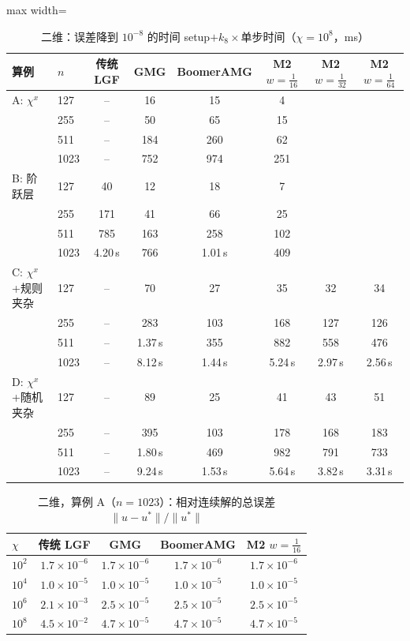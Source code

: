 \begin{table}[H]\centering\small
\caption{二维：误差降到 $10^{-8}$ 的时间 setup$+k_8\times$单步时间（$\chi=10^8$，ms）}\label{tab:t82d}
\begin{adjustbox}{max width=\textwidth}
\begin{tabular}{llcccccc}
\toprule
算例 & $n$ & 传统 LGF & GMG & BoomerAMG & M2 $w{=}\frac1{16}$ & M2 $w{=}\frac1{32}$ & M2 $w{=}\frac1{64}$ \\
\midrule
A: $\chi^x$ & 127 & -- & 16 & 15 & 4 &  &  \\
 & 255 & -- & 50 & 65 & 15 &  &  \\
 & 511 & -- & 184 & 260 & 62 &  &  \\
 & 1023 & -- & 752 & 974 & 251 &  &  \\
\midrule
B: 阶跃层 & 127 & 40 & 12 & 18 & 7 &  &  \\
 & 255 & 171 & 41 & 66 & 25 &  &  \\
 & 511 & 785 & 163 & 258 & 102 &  &  \\
 & 1023 & 4.20\,s & 766 & 1.01\,s & 409 &  &  \\
\midrule
C: $\chi^x$+规则夹杂 & 127 & -- & 70 & 27 & 35 & 32 & 34 \\
 & 255 & -- & 283 & 103 & 168 & 127 & 126 \\
 & 511 & -- & 1.37\,s & 355 & 882 & 558 & 476 \\
 & 1023 & -- & 8.12\,s & 1.44\,s & 5.24\,s & 2.97\,s & 2.56\,s \\
\midrule
D: $\chi^x$+随机夹杂 & 127 & -- & 89 & 25 & 41 & 43 & 51 \\
 & 255 & -- & 395 & 103 & 178 & 168 & 183 \\
 & 511 & -- & 1.80\,s & 469 & 982 & 791 & 733 \\
 & 1023 & -- & 9.24\,s & 1.53\,s & 5.64\,s & 3.82\,s & 3.31\,s \\
\bottomrule
\end{tabular}
\end{adjustbox}
\end{table}

\begin{table}[H]\centering\small
\caption{二维，算例 A（$n=1023$）：相对连续解的总误差 $\|u-u^*\|/\|u^*\|$}\label{tab:aerr二维}
\begin{tabular}{lcccc}
\toprule
$\chi$ & 传统 LGF & GMG & BoomerAMG & M2 $w{=}\frac1{16}$ \\
\midrule
$10^{2}$ & $1.7{\times}10^{-6}$ & $1.7{\times}10^{-6}$ & $1.7{\times}10^{-6}$ & $1.7{\times}10^{-6}$ \\
$10^{4}$ & $1.0{\times}10^{-5}$ & $1.0{\times}10^{-5}$ & $1.0{\times}10^{-5}$ & $1.0{\times}10^{-5}$ \\
$10^{6}$ & $2.1{\times}10^{-3}$ & $2.5{\times}10^{-5}$ & $2.5{\times}10^{-5}$ & $2.5{\times}10^{-5}$ \\
$10^{8}$ & $4.5{\times}10^{-2}$ & $4.7{\times}10^{-5}$ & $4.7{\times}10^{-5}$ & $4.7{\times}10^{-5}$ \\
\bottomrule
\end{tabular}
\end{table}